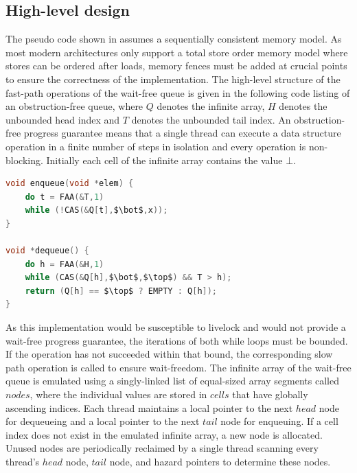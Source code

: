 \documentclass{article}
\begin{document}
\subsection{High-level design}
The pseudo code shown in \cite{WFQ} assumes a sequentially consistent memory model. As most modern architectures only support a total store order memory model where stores can be ordered after loads, memory fences must be added at crucial points to ensure the correctness of the implementation. The high-level structure of the fast-path operations of the wait-free queue is given in the following code listing of an obstruction-free queue, where $Q$ denotes the infinite array, $H$ denotes the unbounded head index and $T$ denotes the unbounded tail index. An obstruction-free progress guarantee means that a single thread can execute a data structure operation in a finite number of steps in isolation and every operation is non-blocking. Initially each cell of the infinite array contains the value $\bot$.
\begin{lstlisting}[mathescape, language=C, label=OFQ, caption=obstruction-free queue]
void enqueue(void *elem) {
    do t = FAA(&T,1)
    while (!CAS(&Q[t],$\bot$,x));
}

void *dequeue() {
    do h = FAA(&H,1)
    while (CAS(&Q[h],$\bot$,$\top$) && T > h);
    return (Q[h] == $\top$ ? EMPTY : Q[h]);
}
\end{lstlisting}
As this implementation would be susceptible to livelock and would not provide a wait-free progress guarantee, the iterations of both while loops must be bounded. If the operation has not succeeded within that bound, the corresponding slow path operation is called to ensure wait-freedom. The infinite array of the wait-free queue is emulated using a singly-linked list of equal-sized array segments called $nodes$, where the individual values are stored in $cells$ that have globally ascending indices. Each thread maintains a local pointer to the next $head$ node for dequeueing and a local pointer to the next $tail$ node for enqueuing. If a cell index does not exist in the emulated infinite array, a new node is allocated. Unused nodes are periodically reclaimed by a single thread scanning every thread's $head$ node, $tail$ node, and hazard pointers to determine these nodes.
\end{document}
